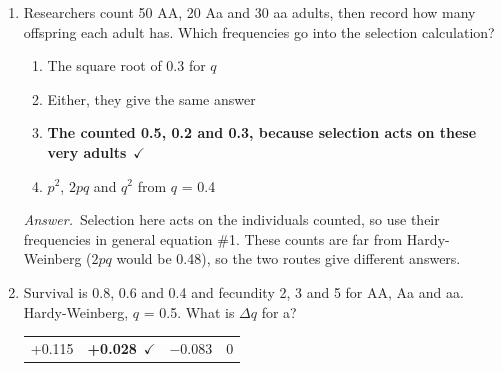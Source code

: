 \documentclass[11pt]{article}
\newcommand{\keyans}[1]{\par\medskip\noindent\textit{Answer.}\ #1\par\medskip}
\begin{document}
\begin{enumerate}[label=\textbf{\arabic*.}, leftmargin=2em, itemsep=1.4em]
\begin{enumerate}[label={}, leftmargin=2.4em, labelwidth=0pt, itemsep=2pt, topsep=0pt]
\end{enumerate}
\keyans{Recessive, \(-\)0.1 \(\times\) 0.5 \(\times\) 0.25/0.975 = \(-\)0.0128. Dominant, \(-\)0.1 \(\times\) 0.25 \(\times\) 0.5/0.925 = \(-\)0.0135. When the allele is common, half its copies are already in homozygotes, so hiding barely matters. The big gap only appears when \(q\) is small.}
\item Researchers count 50 AA, 20 Aa and 30 aa adults, then record how many offspring each adult has. Which frequencies go into the selection calculation?
\nopagebreak\par{}
\par\smallskip
\begin{enumerate}[label={}, leftmargin=2.4em, labelwidth=0pt, itemsep=2pt, topsep=0pt]
\item \hspace*{-2.4em}The square root of 0.3 for \(q\)
\item \hspace*{-2.4em}Either, they give the same answer
\item \hspace*{-2.4em}\textbf{The counted 0.5, 0.2 and 0.3, because selection acts on these very adults}\ \(\checkmark\)
\item \hspace*{-2.4em}\(p^2\), \(2pq\) and \(q^2\) from \(q\) = 0.4
\end{enumerate}
\keyans{Selection here acts on the individuals counted, so use their frequencies in general equation \#1. These counts are far from Hardy-Weinberg (\(2pq\) would be 0.48), so the two routes give different answers.}
\item Survival is 0.8, 0.6 and 0.4 and fecundity 2, 3 and 5 for AA, Aa and aa. Hardy-Weinberg, \(q\) = 0.5. What is \(\Delta q\) for a?
\nopagebreak\par{}
\par\smallskip\noindent\begin{tabularx}{\linewidth}{@{}YYYY@{}}
+0.115 & \textbf{+0.028}\ \(\checkmark\) & \(-\)0.083 & 0 \\
\end{tabularx}

\end{enumerate}
\end{document}
